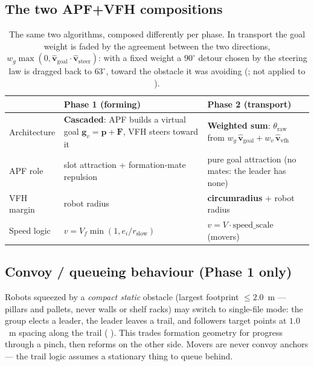 \subsection{The two APF+VFH compositions}

\begin{table}[h]
\centering
\begin{tabular}{@{}lp{6.2cm}p{6.2cm}@{}}
\toprule
 & \textbf{Phase 1 (forming)} & \textbf{Phase 2 (transport)}\\
\midrule
Architecture & \textbf{Cascaded}: APF builds a virtual goal
$\mathbf{g}_v = \mathbf{p} + \mathbf{F}$, VFH steers toward it & 
\textbf{Weighted sum}: $\theta_{\mathrm{raw}}$ from
$w_g\,\hat{\mathbf{v}}_{\mathrm{goal}} + w_v\,\hat{\mathbf{v}}_{\mathrm{vfh}}$\\
APF role & slot attraction + formation-mate repulsion & pure goal attraction
(no mates: the leader has none)\\
VFH margin & robot radius & \textbf{circumradius} $+$ robot radius\\
Speed logic & $v = V_f \min(1, e_i/r_{\mathrm{slow}})$ & $v = V \cdot
\text{speed\_scale}$ (movers)\\
\bottomrule
\end{tabular}
\caption{The same two algorithms, composed differently per phase. In
transport the goal weight is faded by the agreement between the two
directions, $w_g \max(0, \hat{\mathbf{v}}_{\mathrm{goal}} \cdot
\hat{\mathbf{v}}_{\mathrm{steer}})$: with a fixed weight a $90^\circ$ detour
chosen by the steering law is dragged back to $63^\circ$, toward the
obstacle it was avoiding (; not applied to
).}
\label{tab:arch}
\end{table}

\subsection{Convoy / queueing behaviour (Phase 1 only)}

Robots squeezed by a \emph{compact static} obstacle (largest footprint
$\le 2.0$~m --- pillars and pallets, never walls or shelf racks) may switch to
single-file mode: the group elects a leader, the leader leaves a trail, and
followers target points at $1.0$~m spacing along the trail
( ). This trades
formation geometry for progress through a pinch, then reforms on the other
side. Movers are never convoy anchors --- the trail logic assumes a
stationary thing to queue behind.

